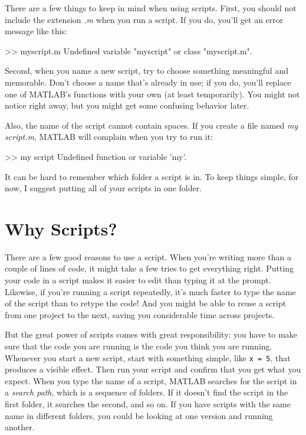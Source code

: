 There are a few things to keep in mind when using scripts. First, you should not include the extension \emph{.m} when you run a script.  If you do, you'll get an error message like this:

\begin{code}
>> myscript.m
Undefined variable "myscript" or class "myscript.m".
\end{code}

Second, when you name a new script, try to choose something meaningful and memorable.
Don't choose a name that's already in use; if you do, you'll replace one of MATLAB's functions with your own (at least temporarily).
You might not notice right away, but you might get some confusing behavior later.


Also, the name of the script cannot contain spaces.  If you create
a file named \emph{my script.m}, MATLAB will complain when you try
to run it:

\begin{code}
>> my script
Undefined function or variable 'my'.
\end{code}

It can be hard to remember which folder a script is in.  To keep things simple,
for now, I suggest putting all of your scripts in one folder.

\section{Why Scripts?}

There are a few good reasons to use a script. When you're writing more than a couple of lines of code, it might take a few tries to get everything right.  Putting your code
in a script makes it easier to edit than typing it at the prompt. Likewise, if you're running a script repeatedly, it's much faster to type the name of the script than to retype the code! And you might be able to reuse a script from one project to the next, saving you considerable time across projects.



But the great power of scripts comes with great responsibility: you have to make sure that the code you are running is the code you think you are running.
Whenever you start a new script, start with something simple, like \lstinline{x = 5}, that produces a visible effect. Then run your script and confirm that you get what you expect.
When you type the name of a script, MATLAB searches for the script in a \emph{search path}, which is a sequence of folders.  If it doesn't find the script in the first folder, it searches the second, and so on.
If you have scripts with the same name in different folders, you could be looking at one version and running another.

